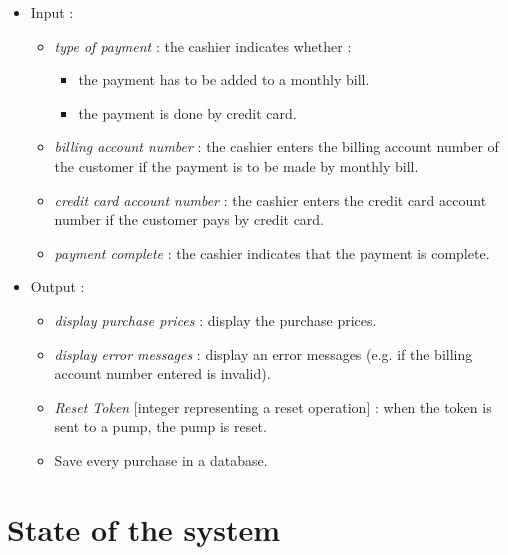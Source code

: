 \documentclass[11pt, a4paper]{article}
\newcommand{\data}[1]{\textit{#1}}
\begin{document}
\begin{itemize}
\item Input :
		\begin{itemize}
		\item \data{type of payment} : the cashier indicates whether : 
					\begin{itemize}
					\item the payment has to be added to a monthly bill.
					\item the payment is done by credit card.
					\end{itemize}
		\item \data{billing account number} : the cashier enters the billing account number of the customer if the payment is to be made by monthly bill.
		\item \data{credit card account number} : the cashier enters the credit card account number if the customer pays by credit card.
		\item \data{payment complete} : the cashier indicates that the payment is complete.
		\end{itemize}

\item Output :
		\begin{itemize}
		\item \data{display purchase prices} : display the purchase prices.
		\item \data{display error messages} : display an error messages (e.g. if the billing account number entered is invalid).
    \item \data{Reset Token} [integer representing a reset operation] : when the token is sent to a pump, the pump is reset.
    \item Save every purchase in a database.
		\end{itemize}
\end{itemize}


\bigskip

\section{State of the system}
\end{document}

